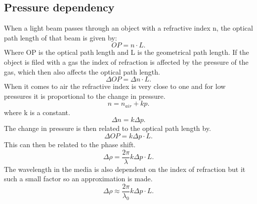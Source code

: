 \documentclass[working, oneside]{inputs/tuftebook}
\begin{document}
\subsection*{Pressure dependency}
When a light beam passes through an object with a refractive index n, the optical path length of that beam is given by:
\[
OP=n \cdot L
.\] 
Where OP is the optical path length and L is the geometrical path length. If the object is filed with a gas the index of refraction is affected by the pressure of the gas, which then also affects the optical path length. 
\[
\Delta OP = \Delta n \cdot L
.\] 
When it comes to air the refractive index is very close to one and for low pressures it is proportional to the change in pressure.
\[
n = n_{air} + kp
.\] 
where k is a constant. 
\[
\Delta n =k\Delta p
.\] 
The change in pressure is then related to the optical path length by.
\[
\Delta OP = k\Delta p\cdot L
.\] 
This can then be related to the phase shift.
\[
\Delta \rho = \frac{2\pi}{\lambda}k\Delta p\cdot L
.\] 
The wavelength in the media is also dependent on the index of refraction but it such a small factor so an approximation is made.
\[
\Delta \rho \approx \frac{2\pi}{\lambda_0}k\Delta p\cdot L
.\] 
\end{document}
